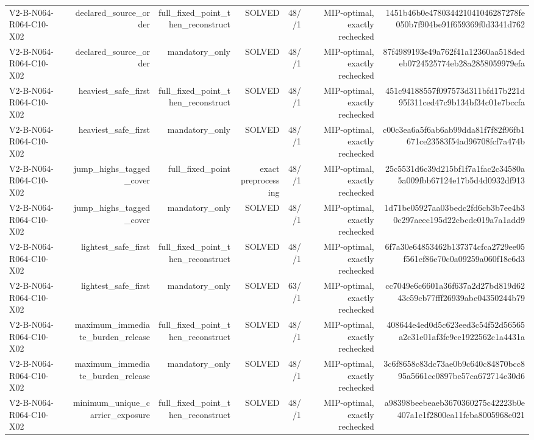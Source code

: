 {\begin{longtable}{lrrrrrr}
V2-B-N064-R064-C10-X02 & declared\_source\_order & full\_fixed\_point\_then\_reconstruct & SOLVED & 48//1 & MIP-optimal, exactly rechecked & 1451b46b0e478034421041046287278fe050b7f904be91f659369f0d3341d762 \\
V2-B-N064-R064-C10-X02 & declared\_source\_order & mandatory\_only & SOLVED & 48//1 & MIP-optimal, exactly rechecked & 87f4989193e49a762f41a12360aa518dedeb0724525774eb28a2858059979efa \\
V2-B-N064-R064-C10-X02 & heaviest\_safe\_first & full\_fixed\_point\_then\_reconstruct & SOLVED & 48//1 & MIP-optimal, exactly rechecked & 451c94188557f097573d311bfd17b221d95f311ced47c9b134bf34c01e7bccfa \\
V2-B-N064-R064-C10-X02 & heaviest\_safe\_first & mandatory\_only & SOLVED & 48//1 & MIP-optimal, exactly rechecked & c00c3ea6a5f6ab6ab99dda81f7f82f96fb1671ce23583f54ad96708fcf7a474b \\
V2-B-N064-R064-C10-X02 & jump\_highs\_tagged\_cover & full\_fixed\_point & exact preprocessing & 48//1 & MIP-optimal, exactly rechecked & 25c5531d6c39d215bf1f7a1fac2c34580a5a009fbb67124e17b5d4d0932df913 \\
V2-B-N064-R064-C10-X02 & jump\_highs\_tagged\_cover & mandatory\_only & SOLVED & 48//1 & MIP-optimal, exactly rechecked & 1d71be05927aa03bedc2fd6cb3b7ee4b30c297aeec195d22cbcdc019a7a1add9 \\
V2-B-N064-R064-C10-X02 & lightest\_safe\_first & full\_fixed\_point\_then\_reconstruct & SOLVED & 48//1 & MIP-optimal, exactly rechecked & 6f7a30e64853462b137374cfca2729ee05f561ef86e70c0a09259a060f18e6d3 \\
V2-B-N064-R064-C10-X02 & lightest\_safe\_first & mandatory\_only & SOLVED & 63//1 & MIP-optimal, exactly rechecked & cc7049e6c6601a36f637a2d27bd819d6243c59cb77fff26939abe04350244b79 \\
V2-B-N064-R064-C10-X02 & maximum\_immediate\_burden\_release & full\_fixed\_point\_then\_reconstruct & SOLVED & 48//1 & MIP-optimal, exactly rechecked & 408644e4ed0d5c623eed3c54f52d56565a2c31e01af3fe9ce1922562c1a4431a \\
V2-B-N064-R064-C10-X02 & maximum\_immediate\_burden\_release & mandatory\_only & SOLVED & 48//1 & MIP-optimal, exactly rechecked & 3c6f8658c83dc73ae0b9c640c84870bcc895a5661cc0897be57ca672714e30d6 \\
V2-B-N064-R064-C10-X02 & minimum\_unique\_carrier\_exposure & full\_fixed\_point\_then\_reconstruct & SOLVED & 48//1 & MIP-optimal, exactly rechecked & a98398beebeaeb3670360275c42223b0e407a1e1f2800ea11fcba8005968e021 \\

\end{longtable}}
